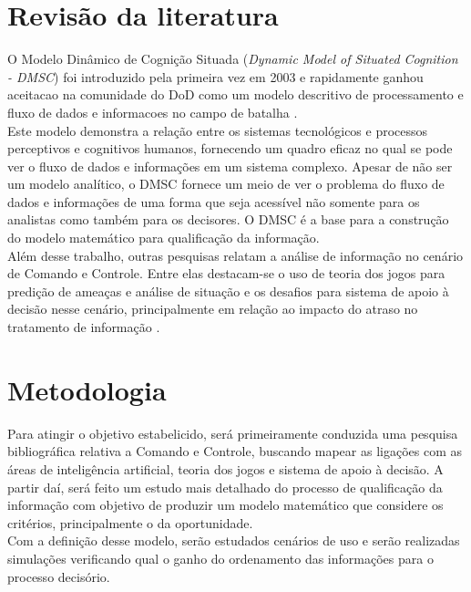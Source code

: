 \documentclass[a4paper,12pt]{article}
\begin{document}
\section{Revisão da literatura}
O Modelo Dinâmico de Cognição Situada (\textit{Dynamic Model of Situated Cognition - DMSC}) foi introduzido pela primeira vez em 2003 e rapidamente ganhou 
aceitacao na comunidade do DoD como um modelo descritivo de processamento e fluxo de dados e informacoes no campo de batalha 
\cite{Phillips 2008}.\\
\indent Este modelo demonstra a relação entre os sistemas tecnológicos e processos perceptivos e cognitivos humanos, fornecendo um quadro eficaz no qual se pode
ver o fluxo de dados e informações em um sistema complexo. Apesar de não ser um modelo analítico, o DMSC fornece um meio de ver o problema do fluxo de dados e 
informações de uma forma que seja acessível não somente para os analistas como também para os decisores. O DMSC é a base para a construção do modelo matemático
 para qualificação da informação.\\
\indent Além desse trabalho, outras pesquisas relatam a análise de informação no cenário de Comando e Controle. Entre elas destacam-se o uso de teoria dos 
jogos para predição de ameaças e análise de situação \cite{Brynielsson 2004} e os desafios para sistema de apoio à decisão nesse cenário, principalmente em 
relação ao impacto do atraso no tratamento de informação \cite{Athans 1986}.\\


\section{Metodologia}
\indent Para atingir o objetivo estabelicido, será primeiramente conduzida uma pesquisa bibliográfica relativa a Comando e Controle, buscando mapear as ligações 
com as áreas de inteligência artificial, teoria dos jogos e sistema de apoio à decisão. A partir daí, será feito um estudo mais 
detalhado do processo de qualificação da informação com objetivo de produzir um modelo matemático que considere os critérios, principalmente o da oportunidade.\\
\indent Com a definição desse modelo, serão estudados cenários de uso e serão realizadas simulações verificando qual o ganho do ordenamento das informações para
 o processo decisório.
\end{document}
